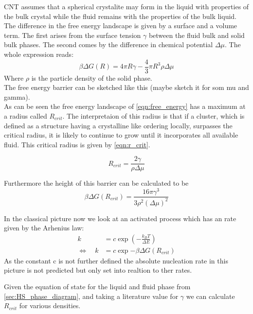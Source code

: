CNT assumes that a spherical crystalite may form in the liquid with properties of the bulk crystal while the fluid remains with the properties of the bulk liquid. The difference in the free energy landscape is given by a surface and a volume term. The first arises from the surface tension $\gamma$ between the fluid bulk and solid bulk phases. The second comes by the difference in chemical potential $\Delta \mu$. The whole expression reads:
\begin{equation}
\label{eqn:free_energy}
\beta \Delta G(R) =4 \pi R \gamma -\frac{4}{3} \pi R^3 \rho \Delta \mu  
\end{equation}
Where $\rho$ is the particle density of the solid phase.\\

The free energy barrier can be sketched like this (maybe sketch it for som mu and gamma).\\

As can be seen the free energy landscape of \autoref{eqn:free_energy} has a maximum at a radius called $R_{crit}$. The interpretaion of this radius is that if a cluster, which is defined as a structure having a crystalline like ordering locally, surpasses the critical radius, it is likely to continue to grow until it incorporates all available fluid. This critical radius is given by \autoref{eqn:r_crit}.

\begin{equation}
\label{eqn:r_crit}
R_{crit} = \frac{2 \gamma}{\rho \Delta \mu }
\end{equation}

Furthermore the height of this barrier can be calculated to be 
\begin{equation}
\beta \Delta G (R_{crit}) = \frac{16 \pi \gamma^3}{3 \rho^2 (\Delta \mu )^2}
\end{equation}

In the classical picture now we look at an activated process which has an rate given by the Arhenius law:
\begin{align}
k&=c \exp{(-\frac{k_B T}{\Delta E})}\\
\Leftrightarrow \quad k &=c \exp{-\beta \Delta G (R_{crit})}
\end{align}
As the constant c is not further defined the absolute nucleation rate in this picture is not predicted but only set into realtion to ther rates. 

Given the equation of state for the liquid and fluid phase from \autoref{sec:HS_phase_diagram}, and taking a literature value for $\gamma$  we can calculate $R_{crit}$ for various densities.

